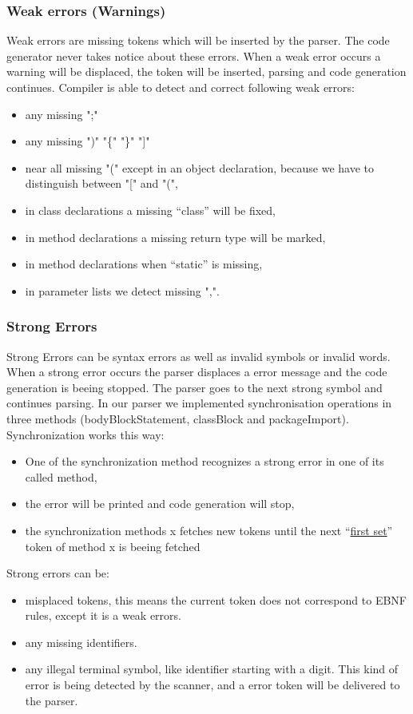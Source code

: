 \subsubsection{Weak errors (Warnings)}
\label{label_weak_errors}
Weak errors are missing tokens which will be inserted by the parser.
The code generator never takes notice about these errors. When a weak error occurs a warning will be displaced,
 the token will be inserted, parsing and code generation continues.
Compiler is able to detect and correct following weak errors:
\begin{itemize}
  \item any missing ";"
  \item any missing ")" "\{" "\}" "]" 
  \item near all missing "(" except in an object declaration, because we have to distinguish between "[" and "(",
  \item in class declarations a missing ``class'' will be fixed,
  \item in method declarations a missing return type will be marked,
  \item in method declarations when ``static'' is missing,
  \item in parameter lists we detect missing ",".
\end{itemize}

\subsubsection{Strong Errors}
\label{label_strong_errors}
Strong Errors can be syntax errors as well as invalid symbols or invalid words. When a strong error occurs the parser displaces a error
message and the code generation is beeing stopped. The parser goes to the next strong symbol and continues parsing.
In our parser we implemented synchronisation operations in three methods (bodyBlockStatement, classBlock and packageImport). Synchronization
works this way:
\begin{itemize}
  \item One of the synchronization method recognizes a strong error in one of its called method,
  \item the error will be printed and code generation will stop,
  \item the synchronization methods x fetches new tokens until the next ``\hyperref[first_sets]{first set}'' token of method x is beeing 
  fetched
\end{itemize}
Strong errors can be:
\begin{itemize}
  \item misplaced tokens, this means the current token does not correspond to EBNF rules, except it is a weak errors.
  \item any missing identifiers.
  \item any illegal terminal symbol, like identifier starting with a digit. This kind of error is being detected by the scanner, and a
  error token will be delivered to the parser.
\end{itemize}


